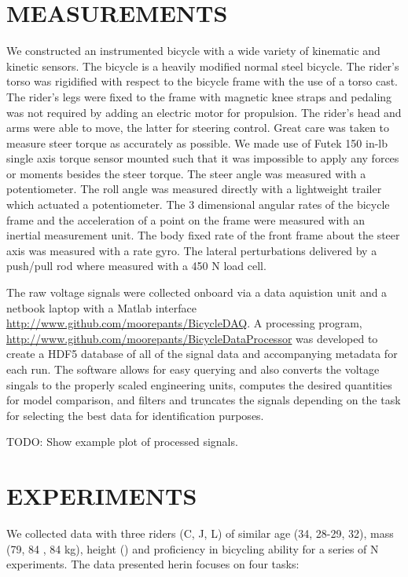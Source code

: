 \documentclass[twocolumn,10pt]{asme2e}
\begin{document}
\section*{MEASUREMENTS}
We constructed an instrumented bicycle with a wide variety of kinematic and
kinetic sensors. The bicycle is a heavily modified normal steel bicycle. The
rider's torso was rigidified with respect to the bicycle frame with the use of
a torso cast. The rider's legs were fixed to the frame with magnetic knee
straps and pedaling was not required by adding an electric motor for
propulsion. The rider's head and arms were able to move, the latter for
steering control. Great care was taken to measure steer torque as accurately as
possible. We made use of Futek 150 in-lb single axis torque sensor mounted such
that it was impossible to apply any forces or moments besides the steer torque.
The steer angle was measured with a potentiometer. The roll angle was measured
directly with a lightweight trailer which actuated a potentiometer. The 3
dimensional angular rates of the bicycle frame and the acceleration of a point
on the frame were measured with an inertial measurement unit. The body fixed
rate of the front frame about the steer axis was measured with a rate gyro. The
lateral perturbations delivered by a push/pull rod where measured with a 450
N load cell.

The raw voltage signals were collected onboard via a data aquistion unit and a
netbook laptop with a Matlab interface
\url{http://www.github.com/moorepants/BicycleDAQ}. A processing program,
\url{http://www.github.com/moorepants/BicycleDataProcessor} was developed to
create a HDF5 database of all of the signal data and accompanying metadata for
each run. The software allows for easy querying and also converts the voltage
singals to the properly scaled engineering units, computes the desired
quantities for model comparison, and filters and truncates the signals
depending on the task for selecting the best data for identification purposes.

TODO: Show example plot of processed signals.

\section*{EXPERIMENTS}
We collected data with three riders (C, J, L) of similar age (34, 28-29, 32),
mass (79, 84 , 84 kg), height () and proficiency in bicycling ability for a
series of N experiments. The data presented herin focuses on four tasks:
\end{document}
